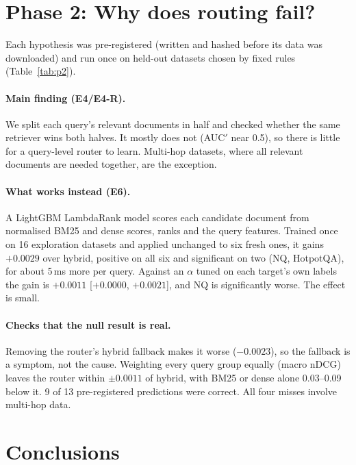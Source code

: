 \documentclass[10pt,twocolumn]{article}
\newcommand{\ci}[2]{[$#1$, $#2$]}
\begin{document}
\section{Phase 2: Why does routing fail?}

Each hypothesis was pre-registered (written and hashed before its data was downloaded) and run once on held-out datasets chosen by fixed rules (Table~\ref{tab:p2}).

\paragraph{Main finding (E4/E4-R).} We split each query's relevant documents in half and checked whether the same retriever wins both halves. It mostly does not (AUC$'$ near 0.5), so there is little for a query-level router to learn. Multi-hop datasets, where all relevant documents are needed together, are the exception.

\paragraph{What works instead (E6).} A LightGBM LambdaRank model scores each candidate document from normalised BM25 and dense scores, ranks and the query features. Trained once on 16 exploration datasets and applied unchanged to six fresh ones, it gains $+0.0029$ over hybrid, positive on all six and significant on two (NQ, HotpotQA), for about 5\,ms more per query. Against an $\alpha$ tuned on each target's own labels the gain is $+0.0011$ \ci{+0.0000}{+0.0021}, and NQ is significantly worse. The effect is small.

\paragraph{Checks that the null result is real.} Removing the router's hybrid fallback makes it worse ($-0.0023$), so the fallback is a symptom, not the cause. Weighting every query group equally (macro nDCG) leaves the router within $\pm 0.0011$ of hybrid, with BM25 or dense alone 0.03--0.09 below it. 9 of 13 pre-registered predictions were correct. All four misses involve multi-hop data.

\section{Conclusions}
\end{document}
